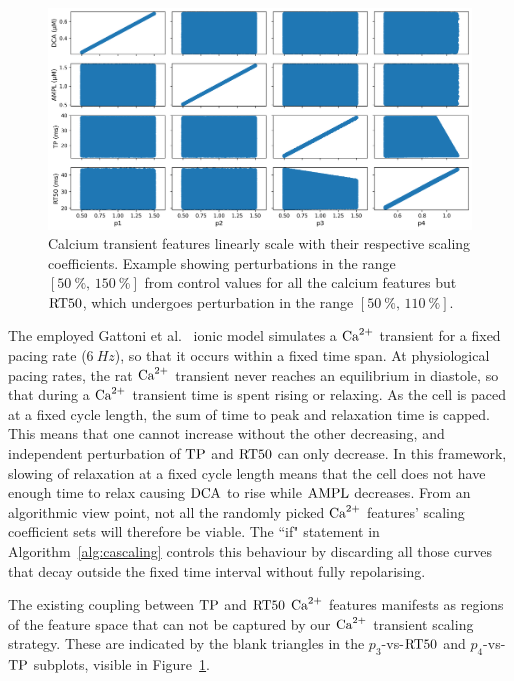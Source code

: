 \begin{figure}[ht!]
    \myfloatalign
    \includegraphics[width=\textwidth]{figures/chapter06/p_vs_b.png}
    \caption{Calcium transient features linearly scale with their respective scaling coefficients. Example showing perturbations in the range $[\SI{50}{\percent},\,\SI{150}{\percent}]$ from control values for all the calcium features but $\textrm{RT50}$, which undergoes perturbation in the range $[\SI{50}{\percent},\,\SI{110}{\percent}]$.}
    \label{fig:scalersvscafeatures}
\end{figure}

\vspace{0.2cm}
The employed Gattoni et al.~\cite{Gattoni:2017} ionic model simulates a $\textrm{Ca}^{2+}$ transient for a fixed pacing rate ($\SI{6}{Hz}$), so that it occurs within a fixed time span. At physiological pacing rates, the rat $\textrm{Ca}^{2+}$ transient never reaches an equilibrium in diastole, so that during a $\textrm{Ca}^{2+}$ transient time is spent rising or relaxing. As the cell is paced at a fixed cycle length, the sum of time to peak and relaxation time is capped. This means that one cannot increase without the other decreasing, and independent perturbation of $\textrm{TP}$ and $\textrm{RT50}$ can only decrease. In this framework, slowing of relaxation at a fixed cycle length means that the cell does not have enough time to relax causing $\textrm{DCA}$ to rise while $\textrm{AMPL}$ decreases. From an algorithmic view point, not all the randomly picked $\textrm{Ca}^{2+}$ features' scaling coefficient sets will therefore be viable. The ``if" statement in Algorithm~\ref{alg:cascaling} controls this behaviour by discarding all those curves that decay outside the fixed time interval without fully repolarising.

\vspace{0.2cm}
The existing coupling between $\textrm{TP}$ and $\textrm{RT50}$ $\textrm{Ca}^{2+}$ features manifests as regions of the feature space that can not be captured by our $\textrm{Ca}^{2+}$ transient scaling strategy. These are indicated by the blank triangles in the $p_3$-vs-$\textrm{RT50}$ and $p_4$-vs-$\textrm{TP}$ subplots, visible in Figure~\ref{fig:scalersvscafeatures}.


